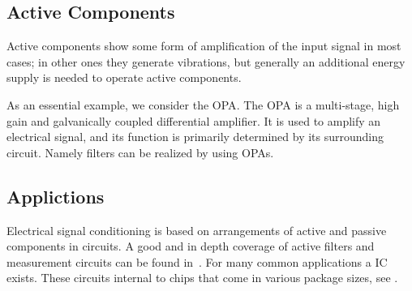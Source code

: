 




\subsection{Active Components}
Active components show some form of amplification of the input signal in most cases; in other ones they generate vibrations, but generally an additional energy supply is needed to operate active components.

As an essential example, we consider the \acf{OPA}. The \ac{OPA} is a multi-stage, high gain and galvanically coupled differential amplifier. It is used to amplify an electrical signal, and its function is primarily determined by its surrounding circuit. Namely filters can be realized by using \ac{OPA}s.

\subsection{Applictions}
Electrical signal conditioning is based on arrangements of active and passive components in circuits. A good and in depth coverage of active filters and measurement circuits can be found in~\cite{Tietze2008EC}. For many common applications a \acf{IC} exists. These circuits internal to chips that come in various package sizes, see .


